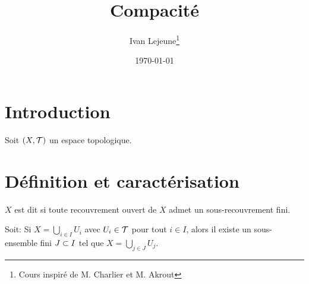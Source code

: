 \documentclass[french,a4paper,10pt]{article}
\title{\color{astral} \sffamily \bfseries Compacité}
\author{Ivan Lejeune\thanks{Cours inspiré de M. Charlier et M. Akrout}}
\date{\today}
\begin{document}
	\maketitle
	
	\section{Introduction}

    Soit $(X, \cal T)$ un espace topologique.

    \section{Définition et caractérisation}
    \begin{definition}
        $X$ est dit  si toute recouvrement ouvert de $X$ admet un sous-recouvrement fini.

        Soit:
        Si $X = \bigcup_{i\in I} U_i$ avec $U_i\in\cal T$ pour tout $i\in I$, alors il existe un sous-ensemble fini $J\subset I$ tel que $X = \bigcup_{j\in J} U_j$.
    \end{definition}

    
	
\end{document}
